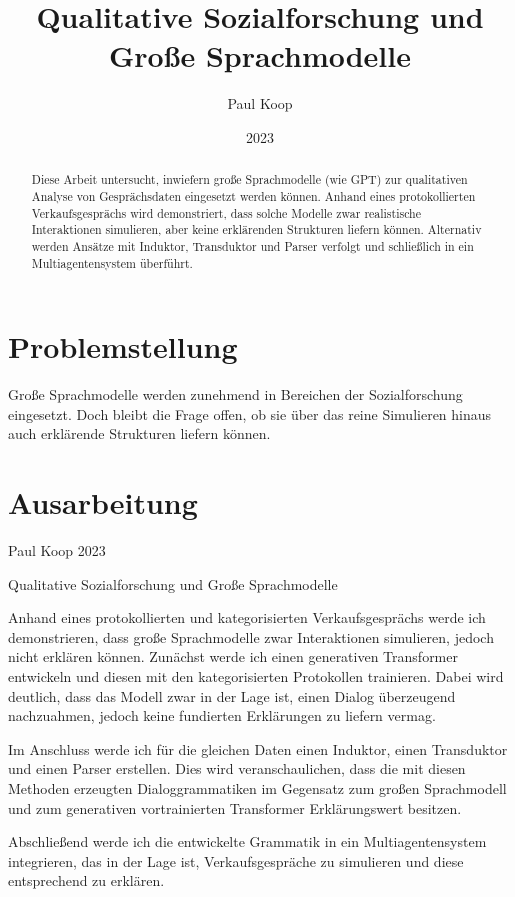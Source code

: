 \documentclass[12pt]{article}
\title{Qualitative Sozialforschung und Große Sprachmodelle}
\author{Paul Koop}
\date{2023}
\begin{document}
\maketitle

\begin{abstract}
Diese Arbeit untersucht, inwiefern große Sprachmodelle (wie GPT) zur qualitativen Analyse von Gesprächsdaten eingesetzt werden können. Anhand eines protokollierten Verkaufsgesprächs wird demonstriert, dass solche Modelle zwar realistische Interaktionen simulieren, aber keine erklärenden Strukturen liefern können. Alternativ werden Ansätze mit Induktor, Transduktor und Parser verfolgt und schließlich in ein Multiagentensystem überführt.
\end{abstract}

\section{Problemstellung}
Große Sprachmodelle werden zunehmend in Bereichen der Sozialforschung eingesetzt. Doch bleibt die Frage offen, ob sie über das reine Simulieren hinaus auch erklärende Strukturen liefern können.

\section{Ausarbeitung}
Paul Koop 2023

Qualitative Sozialforschung und Große Sprachmodelle

Anhand eines protokollierten und kategorisierten Verkaufsgesprächs werde ich demonstrieren, 
dass große Sprachmodelle zwar Interaktionen simulieren, jedoch nicht erklären können. 
Zunächst werde ich einen generativen Transformer entwickeln und diesen mit den kategorisierten Protokollen trainieren. 
Dabei wird deutlich, dass das Modell zwar in der Lage ist, einen Dialog überzeugend nachzuahmen, 
jedoch keine fundierten Erklärungen zu liefern vermag.

Im Anschluss werde ich für die gleichen Daten einen Induktor, einen Transduktor und einen Parser erstellen. 
Dies wird veranschaulichen, dass die mit diesen Methoden erzeugten Dialoggrammatiken im Gegensatz zum großen Sprachmodell 
und zum generativen vortrainierten Transformer Erklärungswert besitzen.

Abschließend werde ich die entwickelte Grammatik in ein Multiagentensystem integrieren, das in der Lage ist, 
Verkaufsgespräche zu simulieren und diese entsprechend zu erklären.
\end{document}
